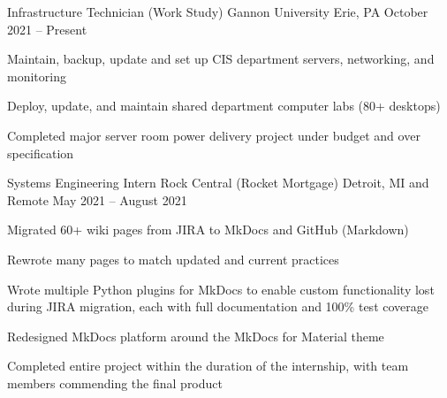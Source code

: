 \documentclass[]{awesome-cv}
\begin{document}
\vspace{-2mm}
\begin{cventries}
	\cventry
	{Infrastructure Technician (Work Study)}
	{Gannon University}
	{Erie, PA}
	{October 2021 – Present}
	{\begin{cvitems}
		\item {Maintain, backup, update and set up CIS department servers, networking, and monitoring}
		\item {Deploy, update, and maintain shared department computer labs (80+ desktops)}
		\item {Completed major server room power delivery project under budget and over specification}
		\end{cvitems}}
	\cventry
	{Systems Engineering Intern}
	{Rock Central (Rocket Mortgage)}
	{Detroit, MI and Remote}
	{May 2021 – August 2021}
	{\begin{cvitems}
		\item {Migrated 60+ wiki pages from JIRA to MkDocs and GitHub (Markdown)}
		\item {Rewrote many pages to match updated and current practices}
		\item {Wrote multiple Python plugins for MkDocs to enable custom functionality lost during JIRA migration, each with full documentation and 100\% test coverage}
		\item {Redesigned MkDocs platform around the MkDocs for Material theme}
		\item {Completed entire project within the duration of the internship, with team members commending the final product}
		\end{cvitems}}
\end{cventries}
\end{document}
